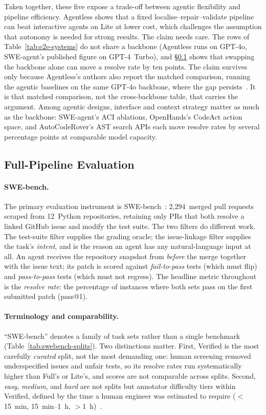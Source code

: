 \documentclass[
  english,        %
  font=times,     %
  twocolumn,      %
]{tumarticle}
\begin{document}
Taken together, these five expose a trade-off between agentic flexibility and
pipeline efficiency. Agentless shows that a fixed localise--repair--validate
pipeline can beat interactive agents on Lite at lower cost, which challenges the
assumption that autonomy is needed for strong results. The claim needs care. The
rows of Table~\ref{tab:e2e-systems} do not share a backbone (Agentless runs on
GPT-4o, SWE-agent's published figure on GPT-4~Turbo), and \S\ref{sec:e2e-eval}
shows that swapping the backbone alone can move a resolve rate by ten points. The
claim survives only because Agentless's authors also report the matched
comparison, running the agentic baselines on the same GPT-4o backbone, where the
gap persists~\cite{xia2024agentless}. It is that matched comparison, not the
cross-backbone table, that carries the argument. Among agentic designs, interface
and context strategy matter as much as the backbone: SWE-agent's ACI ablations,
OpenHands's CodeAct action space, and AutoCodeRover's AST search APIs each move
resolve rates by several percentage points at comparable model capacity.

\subsection{Full-Pipeline Evaluation}
\label{sec:e2e-eval}

\paragraph{SWE-bench.}
The primary evaluation instrument is SWE-bench~\cite{jimenez2024swebench}:
2{,}294~merged pull requests scraped from 12~Python repositories, retaining only
PRs that both resolve a linked GitHub issue and modify the test suite. The two
filters do different work. The test-suite filter supplies the grading oracle; the
issue-linkage filter supplies the task's \emph{intent}, and is the reason an agent
has any natural-language input at all. An agent receives the repository snapshot
from \emph{before} the merge together with the issue text; its patch is scored
against \emph{fail-to-pass} tests (which must flip) and \emph{pass-to-pass} tests
(which must not regress). The headline metric throughout is the \emph{resolve
rate}: the percentage of instances where both sets pass on the first submitted
patch (pass@1).

\paragraph{Terminology and comparability.}
``SWE-bench'' denotes a family of task sets rather than a single benchmark
(Table~\ref{tab:swebench-splits}). Two distinctions matter. First, Verified is
the most carefully \emph{curated} split, not the most demanding one: human
screening removed underspecified issues and unfair tests, so its resolve rates run
systematically higher than Full's or Lite's, and scores are not comparable across
splits. Second, \emph{easy}, \emph{medium}, and \emph{hard} are not splits but
annotator difficulty tiers within Verified, defined by the time a human engineer
was estimated to require ($<$15~min, 15~min--1~h, $>$1~h)~\cite{ganhotra2025difficulty}.
\end{document}
